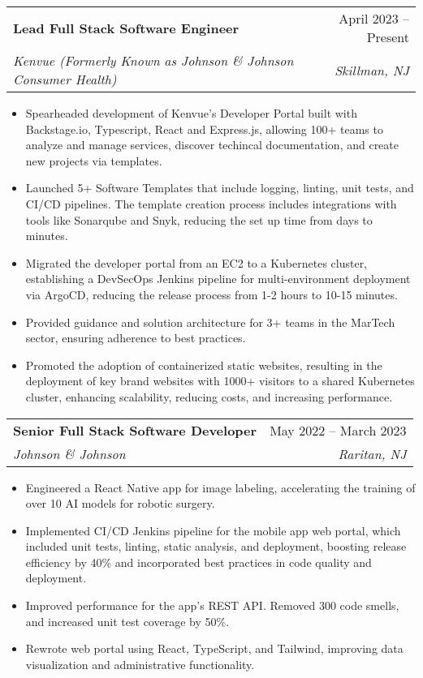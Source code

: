 \documentclass[letterpaper,11pt]{article}
\makeatletter
\newcommand{\resumeItem}[1]{
  \item\small{
    {#1 \vspace{-2pt}}
  }
}
\newcommand{\resumeSubheading}[4]{
  \vspace{-1pt}\item
    \begin{tabular*}{0.99\textwidth}[t]{l@{\extracolsep{\fill}}r}
      \textbf{#1} & #2 \\
      \textit{\small#3} & \textit{\small #4} \\
    \end{tabular*}\vspace{-7pt}
}
\newcommand{\resumeItemListStart}{\begin{itemize}}
\newcommand{\resumeItemListEnd}{\end{itemize}\vspace{-10pt}}
\makeatother
\begin{document}
    \resumeSubheading
      {Lead Full Stack Software Engineer}{April 2023 -- Present}
      {Kenvue (Formerly Known as Johnson \& Johnson Consumer Health)}{Skillman, NJ}
      \resumeItemListStart[leftmargin=0.15in]
        \resumeItem{Spearheaded development of Kenvue's Developer Portal built with Backstage.io, Typescript, React and Express.js, allowing 100+ teams to analyze and manage services, discover techincal documentation, and create new projects via templates. }
        \resumeItem{Launched 5+ Software Templates that include logging, linting, unit tests, and CI/CD pipelines. The template creation process includes integrations with tools like Sonarqube and Snyk, reducing the set up time from days to minutes.}
        \resumeItem{Migrated the developer portal from an EC2 to a Kubernetes cluster, establishing a DevSecOps Jenkins pipeline for multi-environment deployment via ArgoCD, reducing the release process from 1-2 hours to 10-15 minutes.}
        \resumeItem{Provided guidance and solution architecture for 3+ teams in the MarTech sector, ensuring adherence to best practices.}
        \resumeItem{Promoted the adoption of containerized static websites, resulting in the deployment of key brand websites with 1000+ visitors to a shared Kubernetes cluster, enhancing scalability, reducing costs, and increasing performance. }
    \resumeItemListEnd
    
    \resumeSubheading
      {Senior Full Stack Software Developer}{May 2022 -- March 2023}
      {Johnson \& Johnson}{Raritan, NJ}
      \resumeItemListStart[leftmargin=0.15in]
        \resumeItem{Engineered a React Native app for image labeling, accelerating the training of over 10 AI models for robotic surgery.}
        \resumeItem{Implemented CI/CD Jenkins pipeline for the mobile app web portal, which included unit tests, linting, static analysis, and deployment, boosting release efficiency by 40\% and incorporated best practices in code quality and deployment.}
        \resumeItem{Improved performance for the app's REST API. Removed 300 code smells, and increased unit test coverage by 50\%.}
        \resumeItem{Rewrote web portal using React, TypeScript, and Tailwind, improving data visualization and administrative functionality.}
      \resumeItemListEnd
\end{document}
